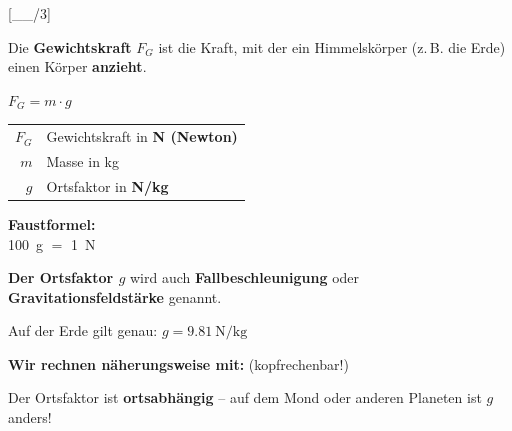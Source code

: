 \documentclass[11pt, a4paper]{article}
\newcommand{\lsg}[1]{\textcolor{loesung}{\textbf{#1}}}
\newcommand{\punktebox}[1]{\hfill\small\textcolor{mittelgrau}{[\_\_/#1]}}
\begin{document}
\begin{merkkasten}[title={Merksatz 2: Die Gewichtskraft}]
\punktebox{3}

\vspace{-0.5em}
\begin{minipage}[t]{0.62\textwidth}
Die \textbf{Gewichtskraft} $F_G$ ist die Kraft, mit der ein Himmelskörper (z.\,B. die Erde) einen Körper \lsg{anzieht}.

\vspace{0.5em}
\begin{formelkasten}
\centering
{\Large $F_G = m \cdot g$}
\end{formelkasten}

\vspace{0.3em}
\begin{tabular}{@{}r@{ = }l@{}}
$F_G$ & Gewichtskraft in \lsg{N (Newton)} \\
$m$   & Masse in \si{\kilogram} \\
$g$   & Ortsfaktor in \lsg{N/kg}
\end{tabular}
\end{minipage}
\hfill
\begin{minipage}[t]{0.32\textwidth}
\centering
{}

\vspace{0.3em}
\textbf{Faustformel:}\\
\SI{100}{\gram} $\hat{=}$ \SI{1}{\newton}
\end{minipage}

\end{merkkasten}


\begin{hinweiskasten}
\textbf{Der Ortsfaktor $g$} wird auch \textbf{Fallbeschleunigung} oder \textbf{Gravitationsfeldstärke} genannt.

\vspace{0.3em}
Auf der Erde gilt genau: $g = \SI{9,81}{\newton\per\kilogram}$

\vspace{0.2em}
\textbf{Wir rechnen näherungsweise mit:}  \quad (kopfrechenbar!)

\vspace{0.3em}
Der Ortsfaktor ist \textbf{ortsabhängig} -- auf dem Mond oder anderen Planeten ist $g$ anders!
\end{hinweiskasten}
\end{document}
